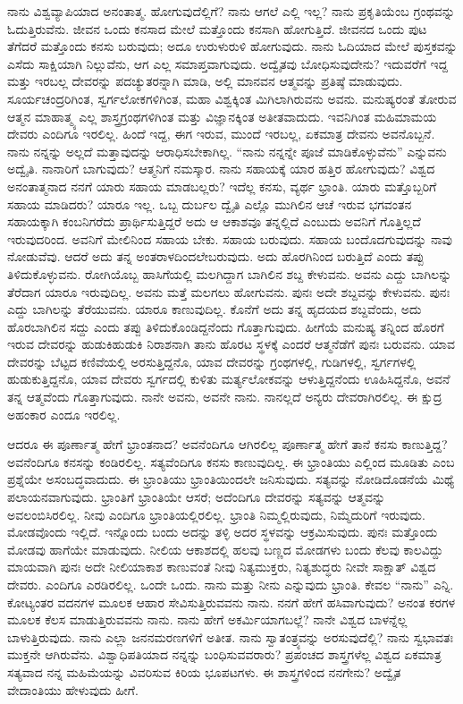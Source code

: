 ನಾನು ವಿಶ್ವವ್ಯಾಪಿಯಾದ ಅನಂತಾತ್ಮ. ಹೋಗುವುದೆಲ್ಲಿಗೆ? ನಾನು ಆಗಲೆ ಎಲ್ಲಿ ಇಲ್ಲ? ನಾನು ಪ್ರಕೃತಿಯೆಂಬ ಗ್ರಂಥವನ್ನು ಓದುತ್ತಿರುವೆನು. ಜೀವನ ಒಂದು ಕನಸಾದ ಮೇಲೆ ಮತ್ತೊಂದು ಕನಸಾಗಿ ಹೋಗುತ್ತಿದೆ. ಜೀವನದ ಒಂದು ಪುಟ ತೆಗೆದರೆ ಮತ್ತೊಂದು ಕನಸು ಬರುವುದು; ಅದೂ ಉರುಳುರುಳಿ ಹೋಗುವುದು. ನಾನು ಓದಿಯಾದ ಮೇಲೆ ಪುಸ್ತಕವನ್ನು ಎಸೆದು ಸಾಕ್ಷಿಯಾಗಿ ನಿಲ್ಲುವೆನು, ಆಗ ಎಲ್ಲ ಸಮಾಪ್ತವಾಗುವುದು. ಅದ್ವೈತವು ಬೋಧಿಸುವುದೇನು? ಇದುವರೆಗೆ ಇದ್ದ ಮತ್ತು ಇರಬಲ್ಲ ದೇವರನ್ನು ಪದಚ್ಯುತರನ್ನಾಗಿ ಮಾಡಿ, ಅಲ್ಲಿ ಮಾನವನ ಆತ್ಮವನ್ನು ಪ್ರತಿಷ್ಠೆ ಮಾಡುವುದು. ಸೂರ್ಯಚಂದ್ರರಿಗಿಂತ, ಸ್ವರ್ಗಲೋಕಗಳಿಗಿಂತ, ಮಹಾ ವಿಶ್ವಕ್ಕಿಂತ ಮಿಗಿಲಾಗಿರುವನು ಅವನು. ಮನುಷ್ಯರಂತೆ ತೋರುವ ಆತ್ಮನ ಮಾಹಾತ್ಮ್ಯ ಎಲ್ಲ ಶಾಸ್ತ್ರಗ್ರಂಥಗಳಿಗಿಂತ ಮತ್ತು ವಿಜ್ಞಾನಕ್ಕಿಂತ ಅತೀತವಾದುದು. ಇವನಿಗಿಂತ ಮಹಿಮಾಮಯ ದೇವರು ಎಂದಿಗೂ ಇರಲಿಲ್ಲ. ಹಿಂದೆ ಇದ್ದ, ಈಗ ಇರುವ, ಮುಂದೆ ಇರಬಲ್ಲ, ಏಕಮಾತ್ರ ದೇವನು ಅವನೊಬ್ಬನೆ. ನಾನು ನನ್ನನ್ನು ಅಲ್ಲದೆ ಮತ್ತಾವುದನ್ನು ಆರಾಧಿಸಬೇಕಾಗಿಲ್ಲ. “ನಾನು ನನ್ನನ್ನೇ ಪೂಜೆ ಮಾಡಿಕೊಳ್ಳುವೆನು” ಎನ್ನುವನು ಅದ್ವೈತಿ. ನಾನಾರಿಗೆ ಬಾಗುವುದು? ಆತ್ಮನಿಗೆ ನಮಸ್ಕಾರ. ನಾನು ಸಹಾಯಕ್ಕೆ ಯಾರ ಹತ್ತಿರ ಹೋಗುವುದು? ವಿಶ್ವದ ಅನಂತಾತ್ಮನಾದ ನನಗೆ ಯಾರು ಸಹಾಯ ಮಾಡಬಲ್ಲರು? ಇದೆಲ್ಲ ಕನಸು, ವ್ಯರ್ಥ ಭ್ರಾಂತಿ. ಯಾರು ಮತ್ತೊಬ್ಬರಿಗೆ ಸಹಾಯ ಮಾಡಿದರು? ಯಾರೂ ಇಲ್ಲ. ಒಬ್ಬ ದುರ್ಬಲ ದ್ವೈತಿ ಎಲ್ಲೊ ಮುಗಿಲಿನ ಆಚೆ ಇರುವ ಭಗವಂತನ ಸಹಾಯಕ್ಕಾಗಿ ಕಂಬನಿಗರೆದು ಪ್ರಾರ್ಥಿಸುತ್ತಿದ್ದರೆ ಅದು ಆ ಆಕಾಶವೂ ತನ್ನಲ್ಲಿದೆ ಎಂಬುದು ಅವನಿಗೆ ಗೊತ್ತಿಲ್ಲದೆ ಇರುವುದರಿಂದ. ಅವನಿಗೆ ಮೇಲಿನಿಂದ ಸಹಾಯ ಬೇಕು. ಸಹಾಯ ಬರುವುದು. ಸಹಾಯ ಬಂದೊದಗುವುದನ್ನು ನಾವು ನೋಡುವೆವು. ಆದರೆ ಅದು ತನ್ನ ಅಂತರಾಳದಿಂದಲೇ\break ಬರುವುದು. ಅದು ಹೊರಗಿನಿಂದ ಬರುತ್ತಿದೆ ಎಂದು ತಪ್ಪು ತಿಳಿದುಕೊಳ್ಳುವನು. ರೋಗಿಯೊಬ್ಬ ಹಾಸಿಗೆಯಲ್ಲಿ ಮಲಗಿದ್ದಾಗ ಬಾಗಿಲಿನ ಶಬ್ದ ಕೇಳುವನು. ಅವನು ಎದ್ದು ಬಾಗಿಲನ್ನು ತೆರೆದಾಗ ಯಾರೂ ಇರುವುದಿಲ್ಲ. ಅವನು ಮತ್ತೆ ಮಲಗಲು ಹೋಗುವನು. ಪುನಃ ಅದೇ ಶಬ್ದವನ್ನು ಕೇಳುವನು. ಪುನಃ ಎದ್ದು ಬಾಗಿಲನ್ನು ತೆರೆಯುವನು. ಯಾರೂ ಕಾಣುವುದಿಲ್ಲ. ಕೊನೆಗೆ ಅದು ತನ್ನ ಹೃದಯದ ಶಬ್ದವೆಂದು, ಅದು ಹೊರಬಾಗಿಲಿನ ಸದ್ದು ಎಂದು ತಪ್ಪು ತಿಳಿದುಕೊಂಡಿದ್ದನೆಂದು ಗೊತ್ತಾಗುವುದು. ಹೀಗೆಯೆ ಮನುಷ್ಯ ತನ್ನಿಂದ ಹೊರಗೆ ಇರುವ ದೇವರನ್ನು ಹುಡುಕಿಹುಡುಕಿ ನಿರಾಶನಾಗಿ ತಾನು ಹೊರಟ ಸ್ಥಳಕ್ಕೆ ಎಂದರೆ ಆತ್ಮನೆಡೆಗೆ ಪುನಃ ಬರುವನು. ಯಾವ ದೇವರನ್ನು ಬೆಟ್ಟದ ಕಣಿವೆಯಲ್ಲಿ ಅರಸುತ್ತಿದ್ದನೊ, ಯಾವ ದೇವರನ್ನು ಗ್ರಂಥಗಳಲ್ಲಿ, ಗುಡಿಗಳಲ್ಲಿ, ಸ್ವರ್ಗಗಳಲ್ಲಿ ಹುಡುಕುತ್ತಿದ್ದನೊ, ಯಾವ ದೇವರು ಸ್ವರ್ಗದಲ್ಲಿ ಕುಳಿತು ಮರ್ತ್ಯಲೋಕವನ್ನು ಆಳುತ್ತಿದ್ದನೆಂದು ಊಹಿಸಿದ್ದನೊ, ಅವನೆ ತನ್ನ ಆತ್ಮವೆಂದು ಗೊತ್ತಾಗುವುದು. ನಾನೇ ಅವನು, ಅವನೇ ನಾನು. ನಾನಲ್ಲದೆ ಅನ್ಯರು ದೇವರಾಗಿರಲಿಲ್ಲ. ಈ ಕ್ಷುದ್ರ ಅಹಂಕಾರ ಎಂದೂ ಇರಲಿಲ್ಲ.

ಆದರೂ ಈ ಪೂರ್ಣಾತ್ಮ ಹೇಗೆ ಭ್ರಾಂತನಾದ? ಅವನೆಂದಿಗೂ ಆಗಿರಲಿಲ್ಲ ಪೂರ್ಣಾತ್ಮ ಹೇಗೆ ತಾನೆ ಕನಸು ಕಾಣುತ್ತಿದ್ದ? ಅವನೆಂದಿಗೂ ಕನಸನ್ನು ಕಂಡಿರಲಿಲ್ಲ. ಸತ್ಯವೆಂದಿಗೂ ಕನಸು ಕಾಣುವುದಿಲ್ಲ. ಈ ಭ್ರಾಂತಿಯು ಎಲ್ಲಿಂದ ಮೂಡಿತು ಎಂಬ ಪ್ರಶ್ನೆಯೇ ಅಸಂಬದ್ಧವಾದುದು. ಈ ಭ್ರಾಂತಿಯು ಭ್ರಾಂತಿಯಿಂದಲೇ ಜನಿಸುವುದು. ಸತ್ಯವನ್ನು ನೋಡಿದೊಡನೆಯೆ ಮಿಥ್ಯೆ ಪಲಾಯನವಾಗುವುದು. ಭ್ರಾಂತಿಗೆ ಭ್ರಾಂತಿಯೇ ಆಸರೆ; ಅದೆಂದಿಗೂ ದೇವರನ್ನು ಸತ್ಯವನ್ನು ಆತ್ಮವನ್ನು ಅವಲಂಬಿಸಿರಲಿಲ್ಲ. ನೀವು ಎಂದಿಗೂ ಭ್ರಾಂತಿಯಲ್ಲಿರಲಿಲ್ಲ. ಭ್ರಾಂತಿ ನಿಮ್ಮಲ್ಲಿರುವುದು, ನಿಮ್ಮೆದುರಿಗೆ ಇರುವುದು. ಮೋಡವೊಂದು ಇಲ್ಲಿದೆ. ಇನ್ನೊಂದು ಬಂದು ಅದನ್ನು ತಳ್ಳಿ ಅದರ ಸ್ಥಳವನ್ನು ಆಕ್ರಮಿಸುವುದು. ಪುನಃ ಮತ್ತೊಂದು ಮೋಡವು ಹಾಗೆಯೇ ಮಾಡುವುದು. ನೀಲಿಯ ಆಕಾಶದಲ್ಲಿ ಹಲವು ಬಣ್ಣದ ಮೋಡಗಳು ಬಂದು ಕೆಲವು ಕಾಲವಿದ್ದು ಮಾಯವಾಗಿ ಪುನಃ ಅದೇ ನೀಲಿಯಾಕಾಶ ಕಾಣುವಂತೆ ನೀವು ನಿತ್ಯಮುಕ್ತರು, ನಿತ್ಯಶುದ್ಧರು ನೀವೇ ಸಾಕ್ಷಾತ್​ ವಿಶ್ವದ ದೇವರು. ಎಂದಿಗೂ ಎರಡಿರಲಿಲ್ಲ. ಒಂದೇ ಒಂದು. ನಾನು ಮತ್ತು ನೀನು ಎನ್ನುವುದು ಭ್ರಾಂತಿ. ಕೇವಲ “ನಾನು” ಎನ್ನಿ. ಕೋಟ್ಯಂತರ ವದನಗಳ ಮೂಲಕ ಆಹಾರ ಸೇವಿಸುತ್ತಿರುವವನು ನಾನು. ನನಗೆ ಹೇಗೆ ಹಸಿವಾಗುವುದು? ಅನಂತ ಕರಗಳ ಮೂಲಕ ಕೆಲಸ ಮಾಡುತ್ತಿರುವವನು ನಾನು. ನಾನು ಹೇಗೆ ಅಕರ್ಮಿಯಾಗಬಲ್ಲೆ? ನಾನೇ ವಿಶ್ವದ ಬಾಳನ್ನೆಲ್ಲ ಬಾಳುತ್ತಿರುವುದು. ನಾನು ಎಲ್ಲಾ ಜನನಮರಣಗಳಿಗೆ ಅತೀತ. ನಾನು ಸ್ವಾತಂತ್ರ್ಯವನ್ನು ಅರಸುವುದೆಲ್ಲಿ? ನಾನು ಸ್ವಭಾವತಃ ಮುಕ್ತನೇ ಆಗಿರುವೆನು. ವಿಶ್ವಾಧಿಪತಿಯಾದ ನನ್ನನ್ನು ಬಂಧಿಸುವವರಾರು? ಪ್ರಪಂಚದ ಶಾಸ್ತ್ರಗಳೆಲ್ಲ ವಿಶ್ವದ ಏಕಮಾತ್ರ ಸತ್ಯವಾದ ನನ್ನ ಮಹಿಮೆಯನ್ನು ವಿವರಿಸುವ ಕಿರಿಯ ಭೂಪಟಗಳು. ಈ ಶಾಸ್ತ್ರಗಳಿಂದ ನನಗೇನು? ಅದ್ವೈತ ವೇದಾಂತಿಯು ಹೇಳುವುದು ಹೀಗೆ.

